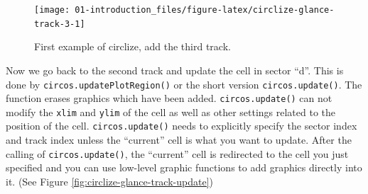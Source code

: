 \documentclass[]{book}
\newenvironment{Shaded}{\begin{snugshade}}{\end{snugshade}}
\newcommand{\KeywordTok}[1]{\textcolor[rgb]{0.13,0.29,0.53}{\textbf{#1}}}
\newcommand{\DataTypeTok}[1]{\textcolor[rgb]{0.13,0.29,0.53}{#1}}
\newcommand{\DecValTok}[1]{\textcolor[rgb]{0.00,0.00,0.81}{#1}}
\newcommand{\FloatTok}[1]{\textcolor[rgb]{0.00,0.00,0.81}{#1}}
\newcommand{\StringTok}[1]{\textcolor[rgb]{0.31,0.60,0.02}{#1}}
\newcommand{\ControlFlowTok}[1]{\textcolor[rgb]{0.13,0.29,0.53}{\textbf{#1}}}
\newcommand{\OperatorTok}[1]{\textcolor[rgb]{0.81,0.36,0.00}{\textbf{#1}}}
\newcommand{\NormalTok}[1]{#1}
\begin{document}
\begin{Shaded}
\end{Shaded}

\begin{figure}

{\centering \texttt{[image: 01-introduction\_files/figure-latex/circlize-glance-track-3-1]} 

}

\caption{First example of circlize, add the third track.}\label{fig:circlize-glance-track-3}
\end{figure}

Now we go back to the second track and update the cell in sector ``d''.
This is done by \texttt{circos.updatePlotRegion()} or the short version
\texttt{circos.update()}. The function erases graphics which have been
added. \texttt{circos.update()} can not modify the \texttt{xlim} and
\texttt{ylim} of the cell as well as other settings related to the
position of the cell. \texttt{circos.update()} needs to explicitly
specify the sector index and track index unless the ``current'' cell is
what you want to update. After the calling of \texttt{circos.update()},
the ``current'' cell is redirected to the cell you just specified and
you can use low-level graphic functions to add graphics directly into
it. (See Figure \ref{fig:circlize-glance-track-update})

\begin{Shaded}
\end{Shaded}
\end{document}
